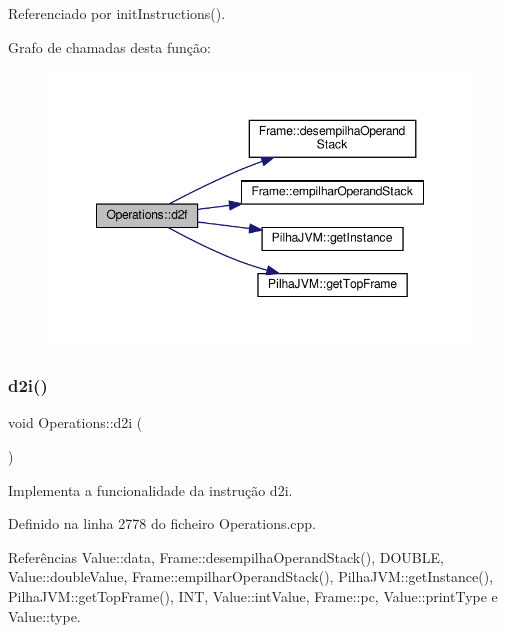 Referenciado por init\+Instructions().

Grafo de chamadas desta função\+:
\nopagebreak
\begin{figure}[H]
\begin{center}
\leavevmode
\includegraphics[width=348pt]{classOperations_ab5a2d770d297ace1ec0e40d3fed9f0e3_cgraph}
\end{center}
\end{figure}
\mbox{\label{classOperations_aa8cda1c04343e047078b72b51c575e1c}} 
\subsubsection{\texorpdfstring{d2i()}{d2i()}}
{\footnotesize\ttfamily void Operations\+::d2i (\begin{DoxyParamCaption}{ }\end{DoxyParamCaption})\hspace{0.3cm}{\ttfamily [private]}}



Implementa a funcionalidade da instrução d2i. 



Definido na linha 2778 do ficheiro Operations.\+cpp.



Referências Value\+::data, Frame\+::desempilha\+Operand\+Stack(), D\+O\+U\+B\+LE, Value\+::double\+Value, Frame\+::empilhar\+Operand\+Stack(), Pilha\+J\+V\+M\+::get\+Instance(), Pilha\+J\+V\+M\+::get\+Top\+Frame(), I\+NT, Value\+::int\+Value, Frame\+::pc, Value\+::print\+Type e Value\+::type.



